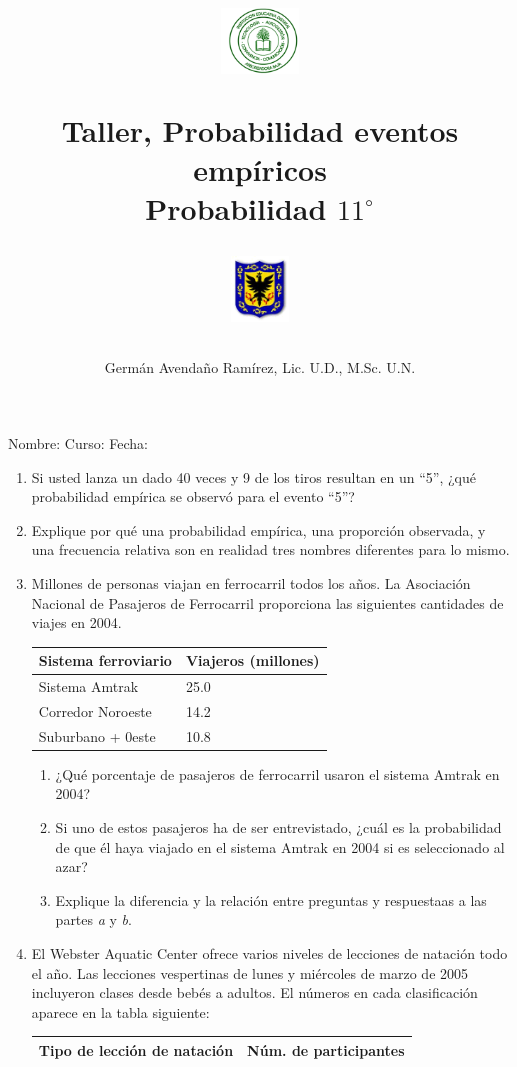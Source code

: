 \documentclass[letterpaper,11pt,twoside]{article}
\author{Germ\'an Avenda\~no Ram\'irez, Lic. U.D., M.Sc. U.N.}
\title{\begin{minipage}{.2\textwidth}
\includegraphics[height=1.75cm]{Images/logo-colegio.png}\end{minipage}
\begin{minipage}{.55\textwidth}
\begin{center}
Taller, Probabilidad eventos empíricos\\
Probabilidad $11^{\circ}$
\end{center}
\end{minipage}\hfill
\begin{minipage}{.2\textwidth}
\includegraphics[height=1.75cm]{Images/logo-sed.png} 
\end{minipage}}
\date{}
\begin{document}
\maketitle
Nombre: \hrulefill Curso: \underline{\hspace*{44pt}} Fecha: \underline{\hspace*{2.5cm}}
\begin{multicols}{2}
 \begin{enumerate}
  \item Si usted lanza un dado 40 veces y 9 de los tiros resultan en un ``5'', ¿qué probabilidad empírica se observó para el evento ``5''?
  \item Explique por qué una probabilidad empírica, una proporción observada, y una frecuencia relativa son en realidad tres nombres diferentes para lo mismo.
  \item Millones de personas viajan en ferrocarril todos los años. La Asociación Nacional de Pasajeros de Ferrocarril proporciona las siguientes cantidades de viajes en 2004.
  \begin{center}
\begin{tabular}{ll}
Sistema ferroviario & Viajeros (millones)\\ \hline
Sistema Amtrak & 25.0\\
Corredor Noroeste & 14.2\\
Suburbano + 0este & 10.8 \hline
  \end{tabular}
  \end{center}
\begin{enumerate}
 \item ¿Qué porcentaje de pasajeros de ferrocarril usaron
el sistema Amtrak en 2004?
\item Si uno de estos pasajeros ha de ser entrevistado, ¿cuál es la probabilidad de que él haya viajado en el sistema Amtrak en 2004 si es seleccionado al azar?
\item Explique la diferencia y la relación entre preguntas y respuestaas  a las partes \textit{a} y \textit{b}.
\end{enumerate}
\item El Webster Aquatic Center ofrece varios niveles de lecciones de natación todo el año. Las lecciones vespertinas de lunes y miércoles de marzo de 2005 incluyeron clases desde bebés a adultos. El números en cada clasificación aparece en la tabla siguiente:
\begin{center}
\begin{tabular}{ll}
Tipo de lección de natación & Núm. de participantes\\ \hline

\end{tabular}
\end{center}
\end{enumerate}
\end{multicols}
\end{document}
